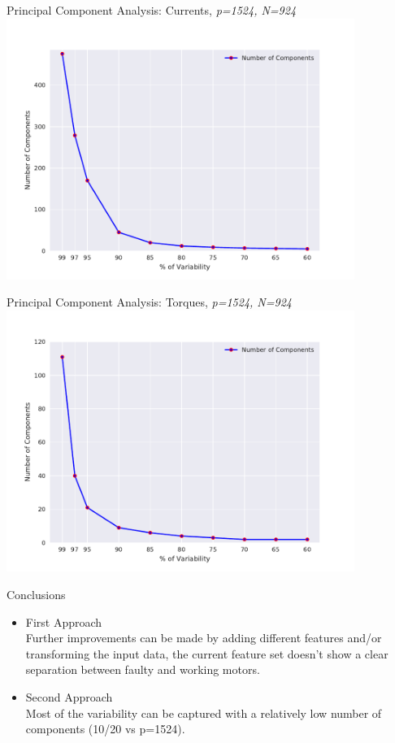 \documentclass[9pt]{beamer}
\begin{document}
\begin{frame}{Principal Component Analysis: Currents, \textit{p=1524, N=924}}
\centering
\includegraphics[width=0.85\textwidth]{n_pc_curr.pdf}
\end{frame}

\begin{frame}{Principal Component Analysis: Torques, \textit{p=1524, N=924}}
\centering
\includegraphics[width=0.85\textwidth]{n_pc_torq.pdf}
\end{frame}

\begin{frame}{Conclusions}
\begin{itemize} 
\item {\large First Approach}\\
Further improvements can be made by adding different features and/or transforming the input data, the current feature set doesn't show a clear separation between faulty and working motors.
\item {\large Second Approach}\\
Most of the variability can be captured with a relatively low number of components (10/20 vs p=1524).
\end{itemize}
\end{frame}
\end{document}
